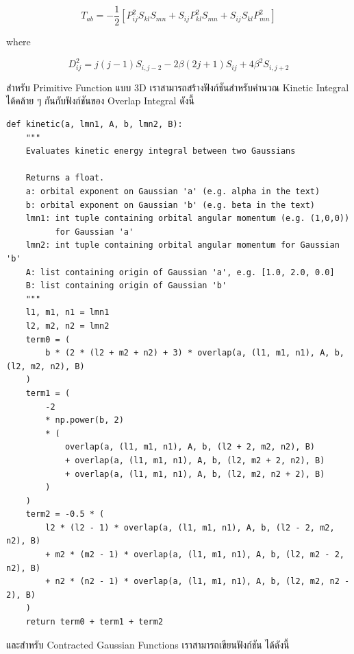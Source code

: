 \begin{equation}
  T_{ab}
  =
  -\frac{1}{2}\left[P_{ij}^2 S_{kl} S_{mn} + S_{ij}P_{kl}^2 S_{mn} + S_{ij} S_{kl} P_{mn}^2\right]
\end{equation}

where

\begin{equation}
  D_{ij}^2
  =
  j(j-1)S_{i,j-2} - 2\beta(2j +1)S_{ij} + 4\beta^2 S_{i,j+2}
\end{equation}

สำหรับ Primitive Function แบบ 3D เราสามารถสร้างฟังก์ชันสำหรับคำนวณ Kinetic Integral ได้คล้าย ๆ กันกับฟังก์ชันของ Overlap
Integral ดังนี้

\vspace{5pt}

\begin{lstlisting}[style=MyPython]
def kinetic(a, lmn1, A, b, lmn2, B):
    """
    Evaluates kinetic energy integral between two Gaussians

    Returns a float.
    a: orbital exponent on Gaussian 'a' (e.g. alpha in the text)
    b: orbital exponent on Gaussian 'b' (e.g. beta in the text)
    lmn1: int tuple containing orbital angular momentum (e.g. (1,0,0))
          for Gaussian 'a'
    lmn2: int tuple containing orbital angular momentum for Gaussian 'b'
    A: list containing origin of Gaussian 'a', e.g. [1.0, 2.0, 0.0]
    B: list containing origin of Gaussian 'b'
    """
    l1, m1, n1 = lmn1
    l2, m2, n2 = lmn2
    term0 = (
        b * (2 * (l2 + m2 + n2) + 3) * overlap(a, (l1, m1, n1), A, b, (l2, m2, n2), B)
    )
    term1 = (
        -2
        * np.power(b, 2)
        * (
            overlap(a, (l1, m1, n1), A, b, (l2 + 2, m2, n2), B)
            + overlap(a, (l1, m1, n1), A, b, (l2, m2 + 2, n2), B)
            + overlap(a, (l1, m1, n1), A, b, (l2, m2, n2 + 2), B)
        )
    )
    term2 = -0.5 * (
        l2 * (l2 - 1) * overlap(a, (l1, m1, n1), A, b, (l2 - 2, m2, n2), B)
        + m2 * (m2 - 1) * overlap(a, (l1, m1, n1), A, b, (l2, m2 - 2, n2), B)
        + n2 * (n2 - 1) * overlap(a, (l1, m1, n1), A, b, (l2, m2, n2 - 2), B)
    )
    return term0 + term1 + term2
\end{lstlisting}

\vspace{5pt}

\noindent และสำหรับ Contracted Gaussian Functions เราสามารถเขียนฟังก์ชัน  ได้ดังนี้

\vspace{5pt}

